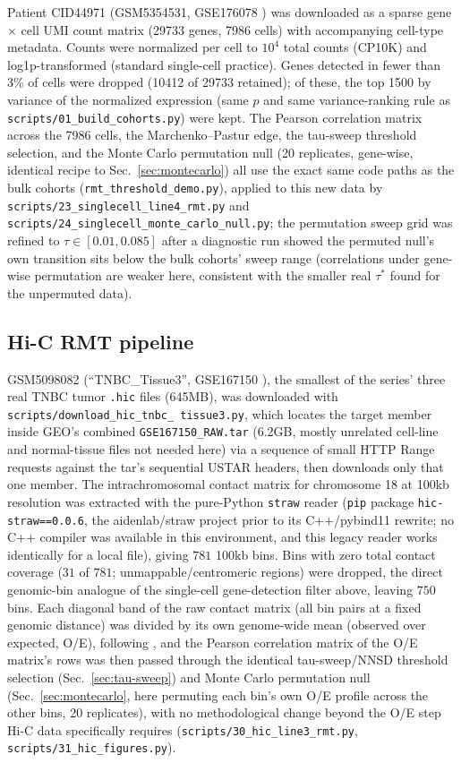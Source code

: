 \documentclass[11pt]{article}
\begin{document}
Patient CID44971 (GSM5354531, GSE176078 \citep{tnbcsc2021}) was
downloaded as a sparse gene $\times$ cell UMI count matrix (29733 genes,
7986 cells) with accompanying cell-type metadata. Counts were
normalized per cell to $10^4$ total counts (CP10K) and log1p-transformed
(standard single-cell practice). Genes detected in fewer than 3\% of
cells were dropped (10412 of 29733 retained); of these, the top 1500 by
variance of the normalized expression (same $p$ and same
variance-ranking rule as \texttt{scripts/01\_build\_cohorts.py}) were
kept. The Pearson correlation matrix across the 7986 cells, the
Marchenko--Pastur edge, the tau-sweep threshold selection, and the
Monte Carlo permutation null (20 replicates, gene-wise, identical
recipe to Sec.~\ref{sec:montecarlo}) all use the exact same code paths
as the bulk cohorts (\texttt{rmt\_threshold\_demo.py}), applied to this
new data by \texttt{scripts/23\_singlecell\_line4\_rmt.py} and
\texttt{scripts/24\_singlecell\_monte\_carlo\_null.py}; the permutation
sweep grid was refined to $\tau\in[0.01,0.085]$ after a diagnostic run
showed the permuted null's own transition sits below the bulk cohorts'
sweep range (correlations under gene-wise permutation are weaker here,
consistent with the smaller real $\tau^*$ found for the unpermuted
data).

\subsection{Hi-C RMT pipeline}
\label{sec:hic-methods}

GSM5098082 (``TNBC\_Tissue3'', GSE167150 \citep{reyesgopar2025}), the
smallest of the series' three real TNBC tumor \texttt{.hic} files
(645MB), was downloaded with \texttt{scripts/download\_hic\_tnbc\_
tissue3.py}, which locates the target member inside GEO's combined
\texttt{GSE167150\_RAW.tar} (6.2GB, mostly unrelated cell-line and
normal-tissue files not needed here) via a sequence of small HTTP Range
requests against the tar's sequential USTAR headers, then downloads
only that one member. The intrachromosomal contact matrix for
chromosome 18 at 100kb resolution was extracted with the pure-Python
\texttt{straw} reader (\texttt{pip} package \texttt{hic-straw==0.0.6},
the aidenlab/straw project prior to its C++/pybind11 rewrite; no C++
compiler was available in this environment, and this legacy reader
works identically for a local file), giving $781$ 100kb bins. Bins with
zero total contact coverage ($31$ of $781$; unmappable/centromeric
regions) were dropped, the direct genomic-bin analogue of the
single-cell gene-detection filter above, leaving $750$ bins. Each
diagonal band of the raw contact matrix (all bin pairs at a fixed
genomic distance) was divided by its own genome-wide mean (observed
over expected, O/E), following \citet{liebermanaiden2009}, and the
Pearson correlation matrix of the O/E matrix's rows was then passed
through the identical tau-sweep/NNSD threshold selection
(Sec.~\ref{sec:tau-sweep}) and Monte Carlo permutation null
(Sec.~\ref{sec:montecarlo}, here permuting each bin's own O/E profile
across the other bins, 20 replicates), with no methodological change
beyond the O/E step Hi-C data specifically requires
(\texttt{scripts/30\_hic\_line3\_rmt.py},
\texttt{scripts/31\_hic\_figures.py}).
\end{document}
